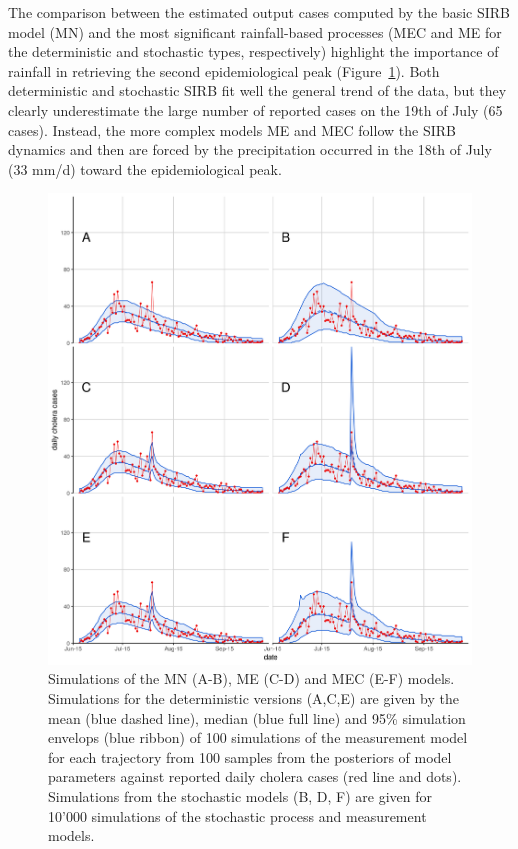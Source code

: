 The comparison between the estimated output cases computed by the basic SIRB model (\textsc{MN}) and the most significant rainfall-based processes (\textsc{MEC} and \textsc{ME} for the deterministic and stochastic types, respectively) highlight the importance of rainfall in retrieving the second epidemiological peak (Figure~\ref{fig:sim}). Both deterministic and stochastic SIRB fit well the general trend of the data, but they clearly underestimate the large number of reported cases on the 19th of July (65 cases). Instead, the more complex models \textsc{ME} and \textsc{MEC} follow the SIRB dynamics and then are forced by the precipitation occurred in the 18th of July (33 mm/d)  toward the epidemiological peak. 
%
\begin{figure}[ht]
    \centering
    \includegraphics{fig_cholera-rainfall/Lemaitre_ACTROP_2018_42_R1_fig4.png}
    \caption[Fit of the different models]{Simulations of the \textsc{MN} (A-B), \textsc{ME} (C-D) and \textsc{MEC} (E-F) models. Simulations for the deterministic versions (A,C,E) are given by the mean (blue dashed line), median (blue full line) and 95\% simulation envelops (blue ribbon) of 100 simulations of the measurement model for each trajectory from 100 samples from the posteriors of model parameters against reported daily cholera cases (red line and dots). Simulations from the stochastic models (B, D, F) are given for 10'000 simulations of the stochastic process and measurement models.}
    \label{fig:sim}
\end{figure}

